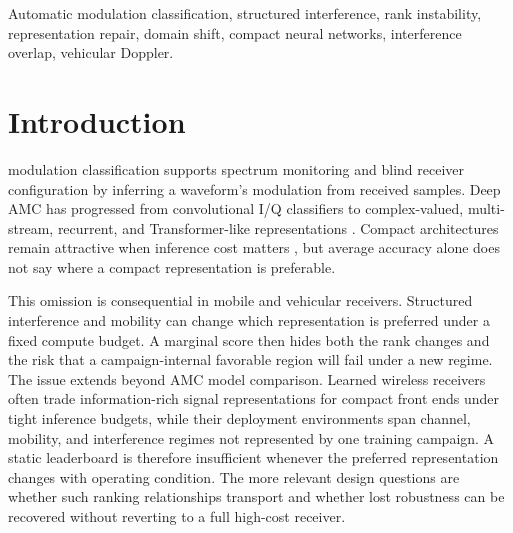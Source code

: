 \documentclass[letterpaper,journal]{IEEEtran}
\begin{document}
\begin{IEEEkeywords}
Automatic modulation classification, structured interference, rank
instability, representation repair, domain shift, compact neural networks,
interference overlap, vehicular Doppler.
\end{IEEEkeywords}

\begin{center}
\end{center}

\section{Introduction}
 modulation classification supports spectrum
monitoring and blind receiver configuration by inferring a waveform's
modulation from received samples. Deep AMC has progressed from convolutional
I/Q classifiers \cite{oshea2016cnn,meng2018amc} to complex-valued,
multi-stream, recurrent, and Transformer-like representations
\cite{tu2020complex,zhang2020dual,xu2020mcldnn,cai2022transformer,
shao2025iqformer}. Compact architectures remain attractive when inference cost
matters \cite{wang2020lightamc,efficientamc2026tgcn}, but average accuracy
alone does not say where a compact representation is preferable.

This omission is consequential in mobile and vehicular receivers. Structured
interference and mobility can change which representation is preferred under
a fixed compute budget. A marginal score then hides both the rank changes and
the risk that a campaign-internal favorable region will fail under a new regime.
The issue extends beyond AMC model comparison. Learned wireless receivers
often trade information-rich signal representations for compact front ends
under tight inference budgets, while their deployment environments span
channel, mobility, and interference regimes not represented by one training
campaign. A static leaderboard is therefore insufficient whenever the
preferred representation changes with operating condition. The more relevant
design questions are whether such ranking relationships transport and whether
lost robustness can be recovered without reverting to a full high-cost
receiver.
\end{document}
